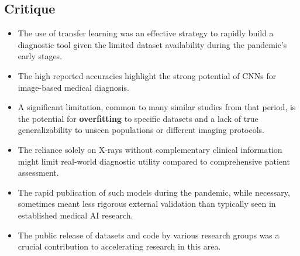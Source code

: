 \subsection*{Critique}
\begin{itemize}
    \item The use of transfer learning was an effective strategy to rapidly build a diagnostic tool given the limited dataset availability during the pandemic's early stages.
    \item The high reported accuracies highlight the strong potential of CNNs for image-based medical diagnosis.
    \item A significant limitation, common to many similar studies from that period, is the potential for \textbf{overfitting} to specific datasets and a lack of true generalizability to unseen populations or different imaging protocols.
    \item The reliance solely on X-rays without complementary clinical information might limit real-world diagnostic utility compared to comprehensive patient assessment.
    \item The rapid publication of such models during the pandemic, while necessary, sometimes meant less rigorous external validation than typically seen in established medical AI research.
\item The public release of datasets and code by various research groups was a crucial contribution to accelerating research in this area.
\end{itemize}